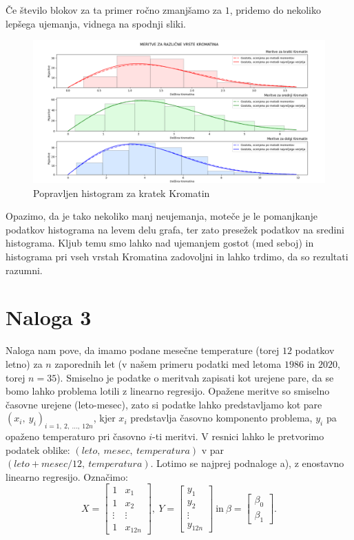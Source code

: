 \documentclass{article}
\begin{document}
Če število blokov za ta primer ročno zmanjšamo za $1$, pridemo do nekoliko lepšega ujemanja, vidnega na spodnji sliki.
\begin{figure}[H]
    \begin{center}
    \includegraphics[width=\linewidth]{naloga2ff.png}
    \vspace*{-5mm}\caption{Popravljen histogram za kratek Kromatin}
    \end{center}    
\end{figure}
Opazimo, da je tako nekoliko manj neujemanja, moteče je le pomanjkanje podatkov histograma na levem delu grafa, ter zato presežek podatkov na sredini histograma. 
Kljub temu smo lahko nad ujemanjem gostot (med seboj) in histograma pri vseh vrstah Kromatina zadovoljni in lahko trdimo, da so rezultati razumni.

\pagebreak

\section{Naloga 3}
Naloga nam pove, da imamo podane mesečne temperature (torej $12$ podatkov letno) za $n$ zaporednih let (v našem primeru podatki med letoma $1986$ in $2020$, torej $n = 35$).
Smiselno je podatke o meritvah zapisati kot urejene pare, da se bomo lahko problema lotili z linearno regresijo.
Opažene meritve so smiselno časovne urejene (leto-mesec), zato si podatke lahko predstavljamo kot pare $(x_i,~y_i)_{i=1,~2,~\dots,~12n}$, kjer $x_i$ predstavlja časovno komponento problema, $y_i$ pa opaženo temperaturo pri časovno $i$-ti meritvi. 
V resnici lahko le pretvorimo podatek oblike: $(leto,~mesec,~temperatura)$ v par $(leto + mesec/12,~temperatura)$.
Lotimo se najprej podnaloge a), z enostavno linearno regresijo.
Označimo:
$$
    X = \begin{bmatrix}
        1 & x_1\\ 
        1 & x_2 \\
        \vdots & \vdots\\ 
        1 & x_{12n}
    \end{bmatrix}, ~
    Y = \begin{bmatrix}
        y_1 \\ 
        y_2 \\
        \vdots \\ 
        y_{12n}
    \end{bmatrix}~\text{in}~ 
    \beta = \begin{bmatrix}
        \beta_0 \\ 
        \beta_1
    \end{bmatrix}.   
$$
\end{document}
